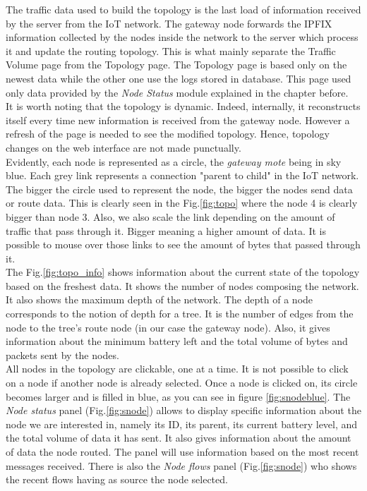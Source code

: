 The traffic data used to build the topology is the last load of information received by the server from the IoT network. The gateway node forwards the IPFIX information collected by the nodes inside the network to the server which process it and update the routing topology. This is what mainly separate the Traffic Volume page from the Topology page. The Topology page is based only on the newest data while the other one use the logs stored in database. This page used only data provided by the \textit{Node Status} module explained in the chapter before.\\

It is worth noting that the topology is dynamic. Indeed, internally, it reconstructs itself every time new information is received from the gateway node. However a refresh of the page is needed to see the modified topology. Hence, topology changes on the web interface are not made punctually. \\

Evidently, each node is represented as a circle, the \textit{gateway mote} being in sky blue. Each grey link represents a connection "parent to child" in the IoT network. The bigger the circle used to represent the node, the bigger the nodes send data or route data. This is clearly seen in the Fig.\ref{fig:topo} where the node 4 is clearly bigger than node 3. Also, we also scale the link depending on the amount of traffic that pass through it. Bigger meaning a higher amount of data. It is possible to mouse over those links to see the amount of bytes that passed through it.\\

The Fig.\ref{fig:topo_info} shows information about the current state of the topology based on the freshest data. It shows the number of nodes composing the network. It also shows the maximum depth of the network. The depth of a node corresponds to the notion of depth for a tree. It is the number of edges from the node to the tree's route node (in our case the gateway node). Also, it gives information about the minimum battery left and the total volume of bytes and packets sent by the nodes.\\

All nodes in the topology are clickable, one at a time. It is not possible to click on a node if another node is already selected. Once a node is clicked on, its circle becomes larger and is filled in blue, as you can see in figure \ref{fig:snodeblue}. The \textit{Node status} panel (Fig.\ref{fig:snode}) allows to display specific information about the node we are interested in, namely its ID, its parent, its current battery level, and the total volume of data it has sent. It also gives information about the amount of data the node routed. The panel will use information based on the most recent messages received. There is also the \textit{Node flows} panel (Fig.\ref{fig:snode}) who shows the recent flows having as source the node selected.\\

